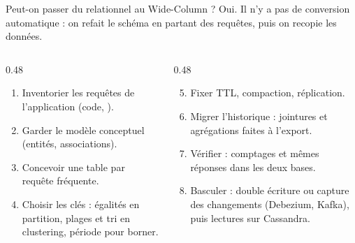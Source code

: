 \documentclass[aspectratio=169,10pt]{beamer}
\newcommand{\cq}[1]{\texttt{\detokenize{#1}}}
\begin{document}
\begin{frame}{Peut-on passer du relationnel au Wide-Column ?}
  Oui. Il n'y a pas de conversion automatique : on refait le schéma en partant des requêtes, puis on recopie les données.
  \vspace{0.3cm}
  \begin{columns}[T]
    \begin{column}{0.48\textwidth}
      \begin{enumerate}
        \item Inventorier les requêtes de l'application (code, \cq{pg_stat_statements}).
        \item Garder le modèle conceptuel (entités, associations).
        \item Concevoir une table par requête fréquente.
        \item Choisir les clés : égalités en partition, plages et tri en clustering, période pour borner.
      \end{enumerate}
    \end{column}
    \begin{column}{0.48\textwidth}
      \begin{enumerate}\setcounter{enumi}{4}
        \item Fixer TTL, compaction, réplication.
        \item Migrer l'historique : jointures et agrégations faites à l'export.
        \item Vérifier : comptages et mêmes réponses dans les deux bases.
        \item Basculer : double écriture ou capture des changements (Debezium, Kafka), puis lectures sur Cassandra.
      \end{enumerate}
    \end{column}
  \end{columns}
\end{frame}
\end{document}
